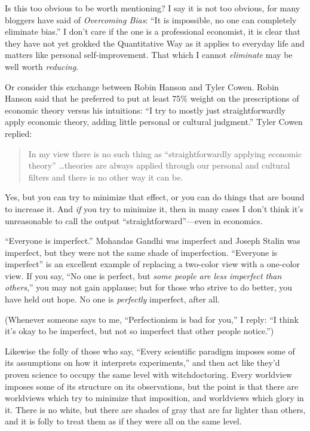 {
 Is this too obvious to be worth mentioning? I say it is not too
obvious, for many bloggers have said of \textit{Overcoming Bias}:
``It is impossible, no one can completely eliminate
bias.'' I don't care if the one is a
professional economist, it is clear that they have not yet grokked the
Quantitative Way as it applies to everyday life and matters like
personal self-improvement. That which I cannot \textit{eliminate} may
be well worth \textit{reducing}.}

{
 Or consider this exchange between Robin Hanson and Tyler Cowen.
Robin Hanson said that he preferred to put at least 75\% weight on the
prescriptions of economic theory versus his intuitions:
``I try to mostly just straightforwardly apply
economic theory, adding little personal or cultural
judgment.'' Tyler Cowen replied:}

\begin{quote}
{
 In my view there is no such thing as
``straightforwardly applying economic
theory'' \ldots theories are always applied through
our personal and cultural filters and there is no other way it can be.}
\end{quote}

{
 Yes, but you can try to minimize that effect, or you can do things
that are bound to increase it. And \textit{if} you try to minimize it,
then in many cases I don't think it's
unreasonable to call the output
``straightforward''---even in
economics.}

{
 ``Everyone is imperfect.''
Mohandas Gandhi was imperfect and Joseph Stalin was imperfect, but they
were not the same shade of imperfection. ``Everyone is
imperfect'' is an excellent example of replacing a
two-color view with a one-color view. If you say, ``No
one is perfect, but \textit{some people are less imperfect than
others},'' you may not gain applause; but for those
who strive to do better, you have held out hope. No one is
\textit{perfectly} imperfect, after all.}

{
 (Whenever someone says to me, ``Perfectionism is
bad for you,'' I reply: ``I think
it's okay to be imperfect, but not so imperfect that
other people notice.'')}

{
 Likewise the folly of those who say, ``Every
scientific paradigm imposes some of its assumptions on how it
interprets experiments,'' and then act like
they'd proven science to occupy the same level with
witchdoctoring. Every worldview imposes some of its structure on its
observations, but the point is that there are worldviews which try to
minimize that imposition, and worldviews which glory in it. There is no
white, but there are shades of gray that are far lighter than others,
and it is folly to treat them as if they were all on the same level.}

